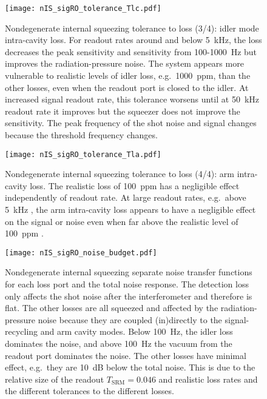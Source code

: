 \begin{figure}
    \centering
    \texttt{[image: nIS\_sigRO\_tolerance\_Tlc.pdf]}
    \caption{ Nondegenerate internal squeezing tolerance to loss (3/4): idler mode intra-cavity loss. For readout rates around and below 5~kHz, the loss decreases the peak sensitivity and sensitivity from 100-1000~Hz but improves the radiation-pressure noise. The system appears more vulnerable to realistic levels of idler loss, e.g.\ 1000~ppm, than the other losses, even when the readout port is closed to the idler. At increased signal readout rate, this tolerance worsens until at 50~kHz readout rate it improves  but the squeezer does not improve the sensitivity. The peak frequency of the shot noise and signal changes because the threshold frequency changes.}
    \label{fig:nIS_sigRO_tolerance_Tlc}
\end{figure}
\begin{figure}
    \centering
    \texttt{[image: nIS\_sigRO\_tolerance\_Tla.pdf]}
    \caption{ Nondegenerate internal squeezing tolerance to loss (4/4): arm intra-cavity loss. The realistic loss of 100~ppm has a negligible effect  independently of readout rate. At large readout rates, e.g.\ above 5~kHz , the arm intra-cavity loss appears to have a negligible effect on the signal or noise even when far above the realistic level of 100~ppm .}
    \label{fig:nIS_sigRO_tolerance_Tla}
\end{figure}
\begin{figure}
    \centering
    \texttt{[image: nIS\_sigRO\_noise\_budget.pdf]}
    \caption{ Nondegenerate internal squeezing separate noise transfer functions for each loss port and the total noise response. The detection loss only affects the shot noise after the interferometer and therefore is flat. The other losses are all squeezed and affected by the radiation-pressure noise because they are coupled (in)directly to the signal-recycling and arm cavity modes. Below 100~Hz, the idler loss dominates the noise, and above 100~Hz the vacuum from the readout port dominates the noise. The other losses have minimal effect, e.g.\ they are 10~dB below the total noise. This is due to the relative size of the readout $T_\text{SRM}=0.046$ and realistic loss rates and the different tolerances to the different losses.}
    \label{fig:nIS_sigRO_noise_budget}
\end{figure}

